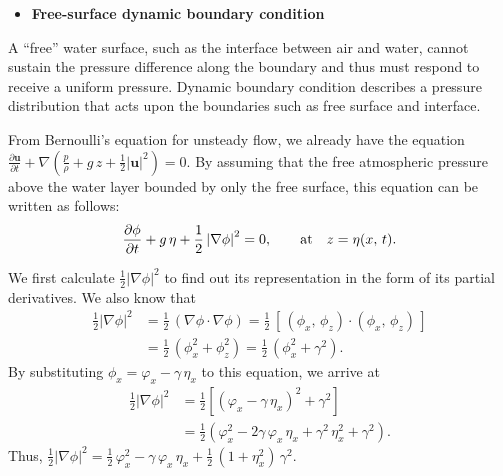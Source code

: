 \documentclass[12pt,a4paper]{report}
\begin{document}
\begin{itemize}[leftmargin=1.2em]
\item \textbf{Free-surface dynamic boundary condition}
\end{itemize}

A ``free'' water surface, such as the interface between air and water, cannot sustain the pressure difference along the boundary and thus must respond to receive a uniform pressure. Dynamic boundary condition describes a pressure distribution that acts upon the boundaries such as free surface and interface.

From Bernoulli's equation for unsteady flow, we already have the equation $\displaystyle \frac{\partial \mathbf{u}}{\partial t} + \nabla \left(\frac{p}{\rho} + g\,z + \frac{1}{2} \left|\mathbf{u}\right|^2 \right) = 0$. By assuming that the free atmospheric pressure above the water layer bounded by only the free surface, this equation can be written as follows:
\begin{equation}
\frac{\partial {\phi}}{\partial t} + g\,\eta + \frac{1}{2} \left|\nabla \phi \right|^2 = 0, \qquad \textmd{at} \quad z = \eta(x,\,t).  \label{bernou}
\end{equation}

We first calculate $\frac{1}{2} \left|\nabla \phi \right|^2$ to find out its representation in the form of its partial derivatives. We also know that 
\begin{align}
\frac{1}{2} \left|\nabla \phi \right|^2 
&= \frac{1}{2} \, \left(\nabla \phi \cdot \nabla \phi \right) 
 = \frac{1}{2} \, \left[\,\left(\phi_{x}, \, \phi_{z} \right) \cdot \left(\phi_{x}, \, \phi_{z} \right) \,\right]  \nonumber \\
&= \frac{1}{2} \, \left(\phi_{x}^2 + \phi_{z}^2 \right) = \frac{1}{2} \,\left(\phi_{x}^2 + \gamma^2 \right).
\end{align}
By substituting $\phi_{x} = \varphi_{x} - \gamma \, \eta_{x}$ to this equation, we arrive at 
\begin{align}
\frac{1}{2} \left|\nabla \phi \right|^2 
&= \frac{1}{2} \left[\left(\varphi_{x} - \gamma \, \eta_{x} \right)^2 + \gamma^2 \right]  \nonumber \\
&= \frac{1}{2} \left(\varphi_{x}^2 - 2 \gamma \, \varphi_{x} \, \eta_{x} + \gamma^2 \, \eta_{x}^2 + \gamma^2 \right).
\end{align}
Thus, $\displaystyle \frac{1}{2} \left|\nabla \phi \right|^2 = \frac{1}{2} \, \varphi_{x}^2 - \gamma \, \varphi_{x} \, \eta_{x} + \frac{1}{2} \,\left(1 + \eta_{x}^2 \right) \, \gamma^2$.
\end{document}
